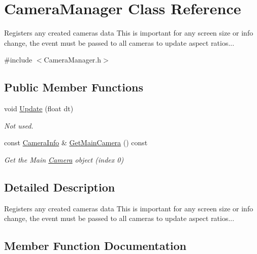 \hypertarget{classCameraManager}{}\section{Camera\+Manager Class Reference}
\label{classCameraManager}


Registers any created camera\textquotesingle{}s data This is important for any screen size or info change, the event must be passed to all cameras to update aspect ratios...  




{\ttfamily \#include $<$Camera\+Manager.\+h$>$}

\subsection*{Public Member Functions}
\begin{DoxyCompactItemize}
\item 
void \hyperlink{classCameraManager_a7667fa4d71bf8b1630c60d4e5e7864eb}{Update} (float dt)
\begin{DoxyCompactList}\small\item\em Not used. \end{DoxyCompactList}\item 
const \hyperlink{structCameraInfo}{Camera\+Info} \& \hyperlink{classCameraManager_ab4ec55062dac1028e8b781ec7bd94bf1}{Get\+Main\+Camera} () const
\begin{DoxyCompactList}\small\item\em Get the Main \hyperlink{classCamera}{Camera} object (index 0) \end{DoxyCompactList}\end{DoxyCompactItemize}


\subsection{Detailed Description}
Registers any created camera\textquotesingle{}s data This is important for any screen size or info change, the event must be passed to all cameras to update aspect ratios... 

\subsection{Member Function Documentation}
\mbox{\label{classCameraManager_ab4ec55062dac1028e8b781ec7bd94bf1}} 
